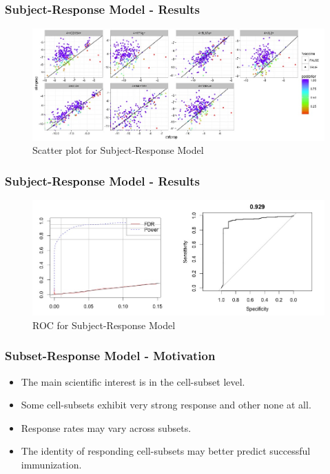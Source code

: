 \documentclass{beamer}
\theoremstyle{definition}
\begin{document}

\begin{frame}
\frametitle{Subject-Response Model - Results}
\begin{figure}[]
\includegraphics[width=12 cm]{figures/subjectLevelScatter} \caption{Scatter plot for Subject-Response Model}
\end{figure}
\end{frame}



\begin{frame}
\frametitle{Subject-Response Model - Results}
\begin{figure}[]
\includegraphics[width=12 cm]{figures/multivaraiteROC} \caption{ROC for Subject-Response Model}
\end{figure}
\end{frame}


\begin{frame}
\frametitle{Subset-Response Model - Motivation}

\begin{itemize}
\item The main scientific interest is in the cell-subset level.
\vspace{0.8 cm}
\item Some cell-subsets exhibit very strong response and other none at all.
\vspace{0.8 cm}
\item Response rates may vary across subsets. 
\vspace{0.8 cm}
\item The identity of responding cell-subsets may better predict successful immunization. 
\end{itemize}
\end{frame}
\end{document}
